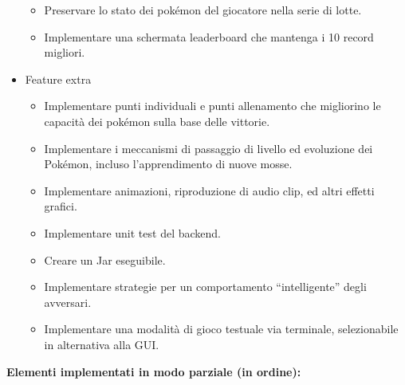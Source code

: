 \documentclass{article}
\begin{document}
\begin{itemize}
\begin{itemize}
            \item Preservare lo stato dei pokémon del giocatore nella serie di lotte. {\color{green}\checkmark}
            
            \item Implementare una schermata leaderboard che mantenga i 10 record migliori. {\color{green}\checkmark}
    
        \end{itemize}

    \item Feature extra

        \begin{itemize}
        \setlength\itemsep{1em}

        \item Implementare punti individuali e punti allenamento che migliorino le capacità dei pokémon sulla base delle vittorie. {\color{yellow}\checkmark}

        \item Implementare i meccanismi di passaggio di livello ed evoluzione dei Pokémon, incluso l’apprendimento di nuove mosse. {\color{yellow}\checkmark}

        \item Implementare animazioni, riproduzione di audio clip, ed altri effetti grafici. {\color{yellow}\checkmark}

        \item Implementare unit test del backend.

        \item Creare un Jar eseguibile.

        \item Implementare strategie per un comportamento “intelligente” degli avversari.

        \item Implementare una modalità di gioco testuale via terminale, selezionabile in alternativa alla GUI.

        \end{itemize}

    \vspace{5pt}

\end{itemize}

\textbf{Elementi implementati in modo parziale (in ordine):} \vspace{4pt}
\end{document}
